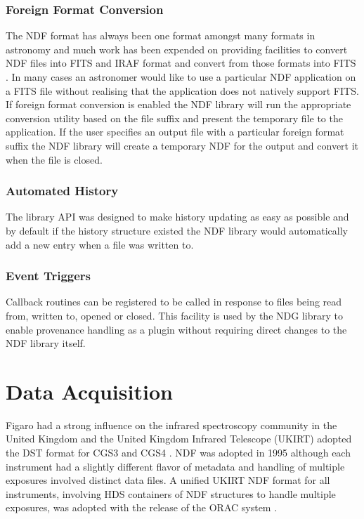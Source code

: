 \documentclass[final,authoryear,5p,times,twocolumn]{elsarticle}
\begin{document}
\subsubsection{Foreign Format Conversion}

The NDF format has always been one format amongst many formats in astronomy and much work has been
expended on providing facilities to convert NDF files into FITS and
IRAF format and convert from those formats into FITS \citep{SUN55}. In
many cases an astronomer would like to use a particular NDF
application on a FITS file without realising that the application does
not natively support FITS. If foreign format conversion is enabled the
NDF library will run the appropriate conversion utility based on the
file suffix and present the temporary file to the application. If the
user specifies an output file with a particular foreign format suffix
the NDF library will create a temporary NDF for the output and convert
it when the file is closed.

\subsubsection{Automated History}

The library API was designed to make history updating as easy
as possible and by default if the history structure existed the NDF
library would automatically add a new entry when a file was written
to.

\subsubsection{Event Triggers}

Callback routines can be registered to be called in response to files
being read from, written to, opened or closed. This facility is used
by the NDG library \citep{SUN2} to enable provenance handling
as a plugin without requiring direct changes to the NDF library itself.

\section{Data Acquisition}
\label{sec:daq}

Figaro had a strong influence on the infrared spectroscopy community
in the United Kingdom and the United Kingdom Infrared Telescope
(UKIRT) adopted the DST format for CGS3 and CGS4 \citep{1993SPIE.1946..547W}. NDF was adopted in
1995 although each instrument had a slightly different flavor of
metadata and handling of multiple exposures involved distinct data
files. A unified UKIRT NDF format for all instruments, involving HDS
containers of NDF structures to handle multiple exposures, was
adopted with the release of the ORAC system \citep{2000SPIE.4009..227B}.
\end{document}
